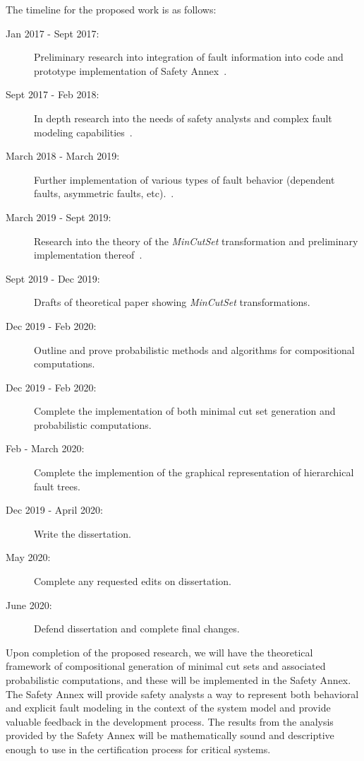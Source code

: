 The timeline for the proposed work is as follows:
\begin{description}
\item[Jan 2017 - Sept 2017:] Preliminary research into integration of fault information into \lustre code and prototype implementation of Safety Annex~\cite{Stewart17:IMBSA}.
\item[Sept 2017 - Feb 2018:] In depth research into the needs of safety analysts and complex fault modeling capabilities~\cite{SATechReport}.
\item[March 2018 - March 2019:] Further implementation of various types of fault behavior (dependent faults, asymmetric faults, etc).~\cite{stewart2020safety}.
\item[March 2019 - Sept 2019:] Research into the theory of the \textit{MinCutSet} transformation and preliminary implementation thereof~\cite{nasaFinalReport}.
\item[Sept 2019 - Dec 2019:] Drafts of theoretical paper showing \textit{MinCutSet} transformations.
\item[Dec 2019 - Feb 2020:]  Outline and prove probabilistic methods and algorithms for compositional computations.
\item[Dec 2019 - Feb 2020:] Complete the implementation of both minimal cut set generation and probabilistic computations.  
\item[Feb - March 2020:]   Complete the implemention of the graphical representation of hierarchical fault trees.
\item[Dec 2019 - April 2020:]  Write the dissertation.
\item[May 2020:]  Complete any requested edits on dissertation.
\item[June 2020:]  Defend dissertation and complete final changes. 
\end{description}

Upon completion of the proposed research, we will have the theoretical framework of compositional generation of minimal cut sets and associated probabilistic computations, and these will be implemented in the Safety Annex. The Safety Annex will provide safety analysts a way to represent both behavioral and explicit fault modeling in the context of the system model and provide valuable feedback in the development process. The results from the analysis provided by the Safety Annex will be mathematically sound and descriptive enough to use in the certification process for critical systems. 